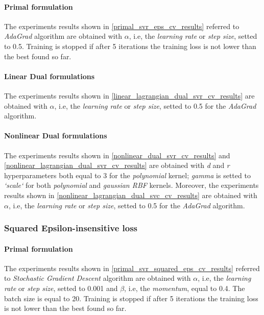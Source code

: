 \paragraph{Primal formulation}

The experiments results shown in \ref{primal_svr_eps_cv_results} referred to \emph{AdaGrad} algorithm are obtained with $\alpha$, i.e, the \emph{learning rate} or \emph{step size}, setted to 0.5. Training is stopped if after 5 iterations the training loss is not lower than the best found so far.



\paragraph{Linear Dual formulations}

The experiments results shown in \ref{linear_lagrangian_dual_svr_cv_results} are obtained with $\alpha$, i.e, the \emph{learning rate} or \emph{step size}, setted to 0.5 for the \emph{AdaGrad} algorithm.





\paragraph{Nonlinear Dual formulations}

The experiments results shown in \ref{nonlinear_dual_svr_cv_results} and \ref{nonlinear_lagrangian_dual_svr_cv_results} are obtained with \emph{d} and \emph{r} hyperparameters both equal to 3 for the \emph{polynomial} kernel; \emph{gamma} is setted to \emph{`scale`} for both \emph{polynomial} and \emph{gaussian RBF} kernels. Moreover, the experiments results shown in \ref{nonlinear_lagrangian_dual_svc_cv_results} are obtained with $\alpha$, i.e, the \emph{learning rate} or \emph{step size}, setted to 0.5 for the \emph{AdaGrad} algorithm.






\subsubsection{Squared Epsilon-insensitive loss}

\paragraph{Primal formulation}

The experiments results shown in \ref{primal_svr_squared_eps_cv_results} referred to \emph{Stochastic Gradient Descent} algorithm are obtained with $\alpha$, i.e, the \emph{learning rate} or \emph{step size}, setted to 0.001 and $\beta$, i.e, the \emph{momentum}, equal to 0.4. The batch size is equal to 20. Training is stopped if after 5 iterations the training loss is not lower than the best found so far.

